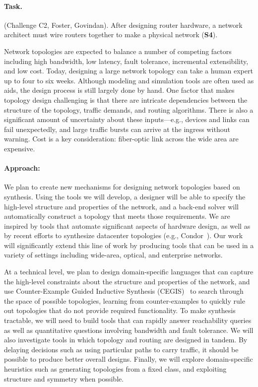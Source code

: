 \paragraph*{Task.} (Challenge C2, Foster, Govindan). After designing
router hardware, a network architect must wire routers together to
make a physical network ({\bf S4}).
%

Network topologies are expected to balance a number of competing
factors including high bandwidth, low latency, fault tolerance,
incremental extensibility, and low cost. Today, designing a large
network topology can take a human expert up to four to six
weeks. Although modeling and simulation tools are often used as aids,
the design process is still largely done by hand. One factor that
makes topology design challenging is that there are intricate
dependencies between the structure of the topology, traffic demands,
and routing algorithms. There is also a significant amount of
uncertainty about these inputs---e.g., devices and links can fail
unexpectedly, and large traffic bursts can arrive at the ingress
without warning. Cost is a key consideration: fiber-optic link across
the wide area are expensive. 

\paragraph*{Approach:}
%
We plan to create new mechanisms for designing network topologies
based on synthesis. Using the tools we will develop, a designer will
be able to specify the high-level structure and properties of the
network, and a back-end solver will automatically construct a topology
that meets those requirements. We are inspired by tools that automate
significant aspects of hardware design, as well as by recent efforts
to synthesize datacenter topologies (e.g., Condor~\cite{condor}). Our
work will significantly extend this line of work by producing tools
that can be used in a variety of settings including wide-area,
optical, and enterprise networks.

At a technical level, we plan to design domain-specific languages that
can capture the high-level constraints about the structure and
properties of the network, and use Counter-Example Guided Inductive
Synthesis (CEGIS)~\cite{sketch} to search through the space of possible topologies,
learning from counter-examples to quickly rule out topologies that do
not provide required functionality. To make synthesis tractable, we
will need to build tools that can rapidly answer reachability queries
as well as quantitative questions involving bandwidth and fault
tolerance. We will also investigate tools in which topology and
routing are designed in tandem. By delaying decisions such as using
particular paths to carry traffic, it should be possible to produce
better overall designs. Finally, we will explore domain-specific
heuristics such as generating topologies from a fixed class, and
exploiting structure and symmetry when possible.


